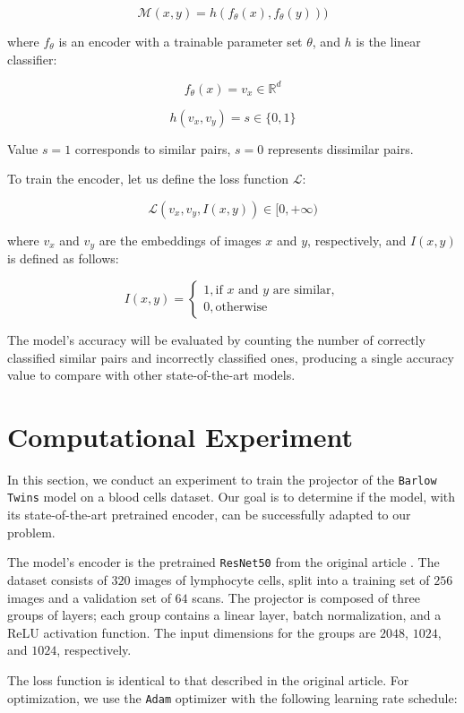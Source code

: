 \documentclass{article}
\begin{document}
$$ \mathcal{M}(x, y) = h(f_{\theta}(x), f_{\theta}(y))) $$

where $f_{\theta}$ is an encoder with a trainable parameter set $\theta$, and 
$h$ is the linear classifier:

$$ f_{\theta}(x) = v_x \in \mathbb{R}^{d} $$

$$ h(v_x, v_y) = s \in \{0, 1\} $$

Value $s = 1$ corresponds to similar pairs, $s = 0$ represents dissimilar pairs.

To train the encoder, let us define the loss function $\mathcal{L}$:

$$ \mathcal{L}(v_x, v_y, I(x, y)) \in [0, +\infty) $$

where $v_x$ and $v_y$ are the embeddings of images $x$ and $y$, respectively, 
and $I(x, y)$ is defined as follows:

$$ I(x, y) = \begin{cases} 
1, \text{if $x$ and $y$ are similar}, \\
0, \text{otherwise}
\end{cases} $$

The model's accuracy will be evaluated by counting the number of correctly classified similar pairs 
and incorrectly classified ones, producing a single accuracy value to compare with other 
state-of-the-art models.

\section{Computational Experiment}

In this section, we conduct an experiment to train the projector of the 
\texttt{Barlow Twins} model on a blood cells dataset. 
Our goal is to determine if the model, with its state-of-the-art pretrained encoder, 
can be successfully adapted to our problem.

The model's encoder is the pretrained \texttt{ResNet50} from the original article
\cite{zbontar2021barlow}. The dataset consists of $320$ images of lymphocyte cells, 
split into a training set of $256$ images and a validation set of $64$ scans. 
The projector is composed of three groups of layers; each group contains a linear layer, 
batch normalization, and a ReLU activation function. 
The input dimensions for the groups are $2048$, $1024$, and $1024$, respectively.

The loss function is identical to that described in the original article. 
For optimization, we use the \texttt{Adam} optimizer with the following learning rate schedule:
\end{document}

